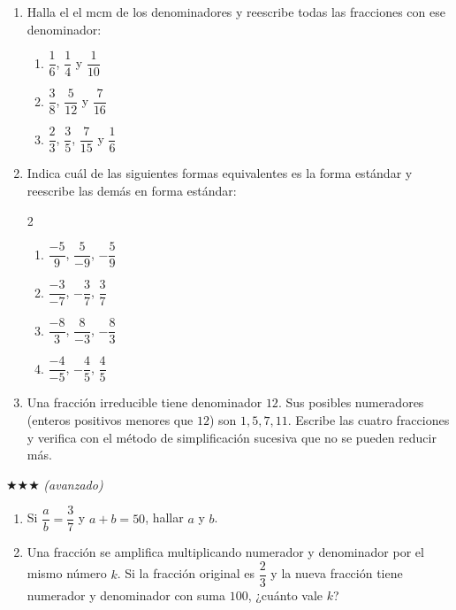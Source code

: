 \documentclass[11pt, letterpaper]{article}
\begin{document}
\begin{enumerate}[label=\textbf{\arabic*.}, leftmargin=*, resume]

\item Halla el el $\text{mcm}$ de los denominadores y reescribe todas las fracciones con ese denominador:
\begin{enumerate}[label=\alph*)]
  \item $\dfrac{1}{6}$, $\dfrac{1}{4}$ y $\dfrac{1}{10}$
  \item $\dfrac{3}{8}$, $\dfrac{5}{12}$ y $\dfrac{7}{16}$
  \item $\dfrac{2}{3}$, $\dfrac{3}{5}$, $\dfrac{7}{15}$ y $\dfrac{1}{6}$
\end{enumerate}

\item Indica cu\'al de las siguientes formas equivalentes es la forma est\'andar y reescribe las dem\'as en forma est\'andar:
\begin{multicols}{2}
\begin{enumerate}[label=\alph*)]
  \item $\dfrac{-5}{9}$, $\dfrac{5}{-9}$, $-\dfrac{5}{9}$
  \item $\dfrac{-3}{-7}$, $-\dfrac{3}{7}$, $\dfrac{3}{7}$
  \item $\dfrac{-8}{3}$, $\dfrac{8}{-3}$, $-\dfrac{8}{3}$
  \item $\dfrac{-4}{-5}$, $-\dfrac{4}{5}$, $\dfrac{4}{5}$
\end{enumerate}
\end{multicols}

\item Una fracci\'on irreducible tiene denominador $12$. Sus posibles numeradores (enteros positivos menores que $12$) son $1, 5, 7, 11$. Escribe las cuatro fracciones y verifica con el m\'etodo de simplificaci\'on sucesiva que no se pueden reducir m\'as.

\end{enumerate}

$\bigstar\bigstar\bigstar$ \textit{(avanzado)}

\begin{enumerate}[label=\textbf{\arabic*.}, leftmargin=*, resume]

\item Si $\dfrac{a}{b} = \dfrac{3}{7}$ y $a + b = 50$, hallar $a$ y $b$.

\item Una fracci\'on se amplifica multiplicando numerador y denominador por el mismo n\'umero $k$. Si la fracci\'on original es $\dfrac{2}{3}$ y la nueva fracci\'on tiene numerador y denominador con suma $100$, ¿cu\'anto vale $k$?



\end{enumerate}
\end{document}
